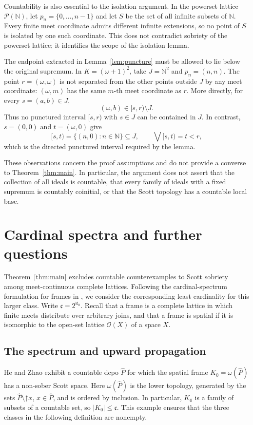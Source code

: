 \documentclass[preprint,11pt]{elsarticle}
\theoremstyle{definition}
\theoremstyle{remark}
\numberwithin{equation}{section}
\newcommand{\N}{\mathbb N}
\newcommand{\up}[1]{\mathord{\uparrow}#1}
\newcommand{\cc}{\mathfrak{c}}
\begin{document}
Countability is also essential to the isolation argument. In the powerset lattice $\mathcal P(\N)$, let $p_n=\{0,\ldots,n-1\}$ and let $S$ be the set of all infinite subsets of $\N$. Every finite meet coordinate admits different infinite extensions, so no point of $S$ is isolated by one such coordinate. This does not contradict sobriety of the powerset lattice; it identifies the scope of the isolation lemma.

The endpoint extracted in Lemma~\ref{lem:puncture} must be allowed to lie below the original supremum. In $K=(\omega+1)^2$, take $J=\N^2$ and $p_n=(n,n)$. The point $r=(\omega,\omega)$ is not separated from the other points outside $J$ by any meet coordinate: $(\omega,m)$ has the same $m$-th meet coordinate as $r$. More directly, for every $s=(a,b)\in J$,
\[
 (\omega,b)\in[s,r)\setminus J.
\]
Thus no punctured interval $[s,r)$ with $s\in J$ can be contained in $J$. In contrast, $s=(0,0)$ and $t=(\omega,0)$ give
\[
 [s,t)=\{(n,0):n\in\N\}\subseteq J,
 \qquad\bigvee[s,t)=t<r,
\]
which is the directed punctured interval required by the lemma.

These observations concern the proof assumptions and do not provide a converse to Theorem~\ref{thm:main}. In particular, the argument does not assert that the collection of all ideals is countable, that every family of ideals with a fixed supremum is countably coinitial, or that the Scott topology has a countable local base.



\section{Cardinal spectra and further questions}\label{sec:cardinal-spectra}
Theorem~\ref{thm:main} excludes countable counterexamples to Scott sobriety among meet-continuous complete lattices. Following the cardinal-spectrum formulation for frames in \cite[Section~5.2]{XuFrames}, we consider the corresponding least cardinality for this larger class. Write $\cc=2^{\aleph_0}$. Recall that a frame is a complete lattice in which finite meets distribute over arbitrary joins, and that a frame is spatial if it is isomorphic to the open-set lattice $\mathcal O(X)$ of a space $X$.

\subsection{The spectrum and upward propagation}
He and Zhao \cite[Proposition~4.11]{HeZhao} exhibit a countable dcpo $\widehat P$ for which the spatial frame $K_0=\omega(\widehat P)$ has a non-sober Scott space. Here $\omega(\widehat P)$ is the lower topology, generated by the sets $\widehat P\setminus\up x$, $x\in\widehat P$, and is ordered by inclusion. In particular, $K_0$ is a family of subsets of a countable set, so $|K_0|\leq\cc$. This example ensures that the three classes in the following definition are nonempty.
\end{document}
